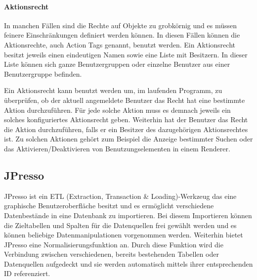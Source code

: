 \paragraph{Aktionsrecht}
In manchen Fällen sind die Rechte auf Objekte zu grobkörnig und es müssen feinere Einschränkungen definiert werden können.
In diesen Fällen können die Aktionsrechte, auch Action Tags genannt, benutzt werden.
Ein Aktionsrecht besitzt jeweils einen eindeutigen Namen sowie eine Liste mit Besitzern.
In dieser Liste können sich ganze Benutzergruppen oder einzelne Benutzer aus einer Benutzergruppe befinden.

Ein Aktionsrecht kann benutzt werden um, im laufenden Programm, zu überprüfen, ob der aktuell angemeldete Benutzer das Recht hat eine bestimmte Aktion durchzuführen.
Für jede solche Aktion muss es demnach jeweils ein solches konfiguriertes Aktionsrecht geben.
Weiterhin hat der Benutzer das Recht die Aktion durchzuführen, falls er ein Besitzer des dazugehörigen Aktionsrechtes ist.
Zu solchen Aktionen gehört zum Beispiel die Anzeige bestimmter Suchen oder das Aktivieren/Deaktivieren von Benutzungselementen in einem Renderer.

\subsection{JPresso}
JPresso ist ein ETL (Extraction, Transaction \& Loading)-Werkzeug das eine graphische Benutzeroberfläche besitzt und es ermöglicht verschiedene Datenbestände in eine Datenbank zu importieren.
Bei diesem Importieren können die Zieltabellen und Spalten für die Datenquellen frei gewählt werden und es können beliebige Datenmanipulationen vorgenommen werden.
Weiterhin bietet JPresso eine Normalisierungsfunktion an.
Durch diese Funktion wird die Verbindung zwischen verschiedenen, bereits bestehenden Tabellen oder Datenquellen aufgedeckt und sie werden automatisch mittels ihrer entsprechenden ID referenziert. \autocite[vgl.][]{cismet-jpresso}



